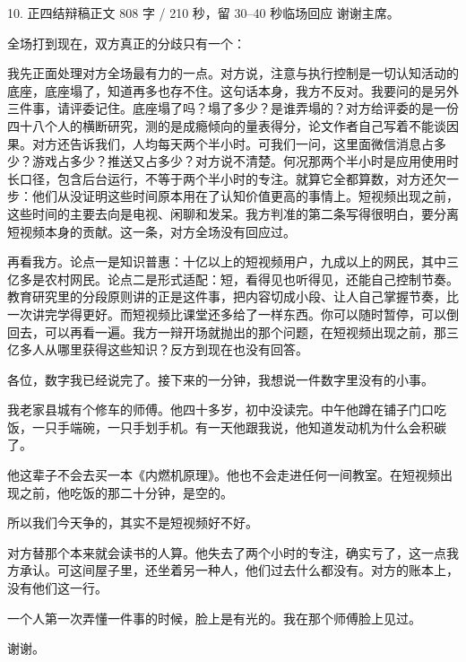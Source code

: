 \documentclass[script,pro]{debate}
\begin{document}
\begin{speech}{10. 正四结辩稿}{正文 808 字 / 210 秒，留 30–40 秒临场回应}
谢谢主席。

全场打到现在，双方真正的分歧只有一个：

我先正面处理对方全场最有力的一点。对方说，注意与执行控制是一切认知活动的底座，底座塌了，知道再多也存不住。这句话本身，我方不反对。我要问的是另外三件事，请评委记住。底座塌了吗？塌了多少？是谁弄塌的？对方给评委的是一份四十八个人的横断研究，测的是成瘾倾向的量表得分，论文作者自己写着不能谈因果。对方还告诉我们，人均每天两个半小时。可我们一问，这里面微信消息占多少？游戏占多少？推送又占多少？对方说不清楚。何况那两个半小时是应用使用时长口径，包含后台运行，不等于两个半小时的专注。就算它全都算数，对方还欠一步：他们从没证明这些时间原本用在了认知价值更高的事情上。短视频出现之前，这些时间的主要去向是电视、闲聊和发呆。我方判准的第二条写得很明白，要分离短视频本身的贡献。这一条，对方全场没有回应过。

再看我方。论点一是知识普惠：十亿以上的短视频用户，九成以上的网民，其中三亿多是农村网民。论点二是形式适配：短，看得见也听得见，还能自己控制节奏。教育研究里的分段原则讲的正是这件事，把内容切成小段、让人自己掌握节奏，比一次讲完学得更好。而短视频比课堂还多给了一样东西。你可以随时暂停，可以倒回去，可以再看一遍。我方一辩开场就抛出的那个问题，在短视频出现之前，那三亿多人从哪里获得这些知识？反方到现在也没有回答。

各位，数字我已经说完了。接下来的一分钟，我想说一件数字里没有的小事。

我老家县城有个修车的师傅。他四十多岁，初中没读完。中午他蹲在铺子门口吃饭，一只手端碗，一只手划手机。有一天他跟我说，他知道发动机为什么会积碳了。

他这辈子不会去买一本《内燃机原理》。他也不会走进任何一间教室。在短视频出现之前，他吃饭的那二十分钟，是空的。

所以我们今天争的，其实不是短视频好不好。

对方替那个本来就会读书的人算。他失去了两个小时的专注，确实亏了，这一点我方承认。可这间屋子里，还坐着另一种人，他们过去什么都没有。对方的账本上，没有他们这一行。

一个人第一次弄懂一件事的时候，脸上是有光的。我在那个师傅脸上见过。

谢谢。

\begin{contingency}
\end{contingency}
\end{speech}
\end{document}
